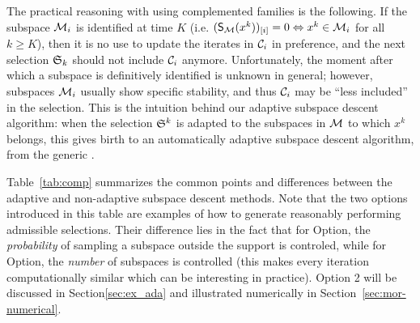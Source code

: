 The practical reasoning with using {complemented} families is the following. If the subspace $\mathcal{M}_i$ is identified at time $K$ (i.e. $(\mathsf{S}_{\mathcal{M}}(x^k))_{[i]}=0 \Leftrightarrow x^k\in\mathcal{M}_i$ for all $k\geq K$), then it is no use to update the iterates in $\mathcal{C}_i$ in preference, and the next selection $\mathfrak{S}_k$ should not include $\mathcal{C}_i$ anymore.
Unfortunately, the moment after which a subspace is definitively identified is unknown in general; however, subspaces $\mathcal{M}_i$ usually show specific stability, and thus $\mathcal{C}_i$ may be ``less included'' in the selection. This is the intuition behind our adaptive subspace descent algorithm: when the selection $\mathfrak{S}^k$ is adapted to the subspaces in $\mathcal{M}$ to which $x^k$ belongs, this gives birth to an automatically adaptive subspace descent algorithm, from the generic \adaalgo.

Table~\ref{tab:comp} summarizes the common points and differences between the adaptive and non-adaptive subspace descent methods. Note that the two options introduced in this table are examples of how to generate reasonably performing admissible selections. {Their difference lies in the fact that for Option, the \emph{probability} of sampling a subspace outside the support is controled, while for Option, the \emph{number} of subspaces is controlled (this makes every iteration computationally similar which can be interesting in practice). }
Option 2 will be 
discussed in Section\;\ref{sec:ex_ada} and 
illustrated numerically in Section~\ref{sec:mor-numerical}. 

